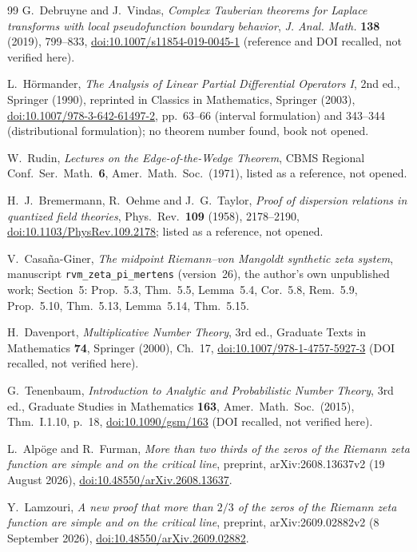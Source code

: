 \documentclass[11pt,a4paper]{article}
\numberwithin{equation}{section}
\theoremstyle{definition}
\theoremstyle{remark}
\begin{document}
\begin{thebibliography}{99}
G.~Debruyne and J.~Vindas, \emph{Complex Tauberian theorems for Laplace transforms with local pseudofunction boundary behavior}, \emph{J. Anal. Math.} \textbf{138} (2019), 799--833, \href{https://doi.org/10.1007/s11854-019-0045-1}{doi:10.1007/s11854-019-0045-1} (reference and DOI recalled, not verified here).

L.~H\"ormander, \emph{The Analysis of Linear Partial Differential Operators I}, 2nd ed., Springer (1990), reprinted in Classics in Mathematics, Springer (2003), \href{https://doi.org/10.1007/978-3-642-61497-2}{doi:10.1007/978-3-642-61497-2}, pp.~63--66 (interval formulation) and 343--344 (distributional formulation); no theorem number found, book not opened.

W.~Rudin, \emph{Lectures on the Edge-of-the-Wedge Theorem}, CBMS Regional Conf.\ Ser.\ Math.\ \textbf{6}, Amer.\ Math.\ Soc.\ (1971), listed as a reference, not opened.

H.~J.~Bremermann, R.~Oehme and J.~G.~Taylor, \emph{Proof of dispersion relations in quantized field theories}, Phys.\ Rev.\ \textbf{109} (1958), 2178--2190, \href{https://doi.org/10.1103/PhysRev.109.2178}{doi:10.1103/PhysRev.109.2178}; listed as a reference, not opened.

V.~Casa\~na-Giner, \emph{The midpoint Riemann--von Mangoldt synthetic zeta system}, manuscript \texttt{rvm\_zeta\_pi\_mertens} (version~26), the author's own unpublished work; Section~5: Prop.~5.3, Thm.~5.5, Lemma~5.4, Cor.~5.8, Rem.~5.9, Prop.~5.10, Thm.~5.13, Lemma~5.14, Thm.~5.15.

H.~Davenport, \emph{Multiplicative Number Theory}, 3rd ed., Graduate Texts in Mathematics \textbf{74}, Springer (2000), Ch.~17, \href{https://doi.org/10.1007/978-1-4757-5927-3}{doi:10.1007/978-1-4757-5927-3} (DOI recalled, not verified here).

G.~Tenenbaum, \emph{Introduction to Analytic and Probabilistic Number Theory}, 3rd ed., Graduate Studies in Mathematics \textbf{163}, Amer.\ Math.\ Soc.\ (2015), Thm.~I.1.10, p.~18, \href{https://doi.org/10.1090/gsm/163}{doi:10.1090/gsm/163} (DOI recalled, not verified here).

L.~Alp\"oge and R.~Furman, \emph{More than two thirds of the zeros of the Riemann zeta function are simple and on the critical line}, preprint, arXiv:2608.13637v2 (19 August 2026), \href{https://doi.org/10.48550/arXiv.2608.13637}{doi:10.48550/arXiv.2608.13637}.

Y.~Lamzouri, \emph{A new proof that more than $2/3$ of the zeros of the Riemann zeta function are simple and on the critical line}, preprint, arXiv:2609.02882v2 (8 September 2026), \href{https://doi.org/10.48550/arXiv.2609.02882}{doi:10.48550/arXiv.2609.02882}.

\end{thebibliography}
\end{document}
